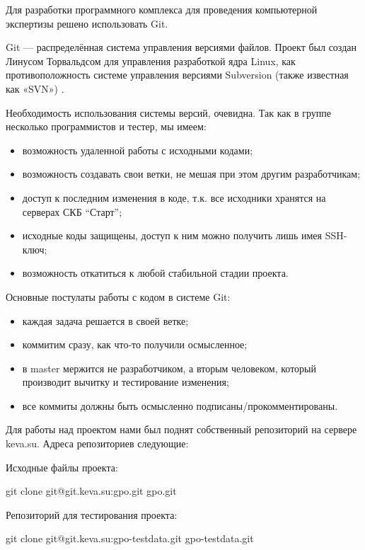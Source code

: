 Для разработки программного комплекса для проведения компьютерной экспертизы решено использовать Git.

Git  — распределённая система управления версиями файлов. Проект был создан Линусом Торвальдсом для управления разработкой ядра Linux,  как противоположность  системе управления версиями Subversion (также известная как «SVN») \cite{progit}.

Необходимость использования системы версий, очевидна. Так как в группе несколько программистов и тестер, мы имеем:
\begin{itemize}
\item возможность удаленной работы с исходными кодами;
\item возможность создавать свои ветки, не мешая при этом другим разработчикам;
\item доступ к последним изменения в коде, т.к. все исходники хранятся на серверах СКБ “Старт”;
\item исходные коды защищены, доступ к ним можно получить лишь имея SSH-ключ;
\item возможность откатиться к любой стабильной стадии проекта.
\end{itemize}

Основные постулаты работы с кодом в системе Git:

\begin{itemize}
\item каждая задача решается в своей ветке;
\item коммитим сразу, как что-то получили осмысленное;
\item в master мержится не разработчиком, а вторым человеком, который производит вычитку и тестирование изменения;
\item все коммиты должны быть осмысленно подписаны/прокомментированы.
\end{itemize}

Для работы над проектом нами был поднят собственный репозиторий на сервере keva.su.
Адреса репозиториев следующие:

Исходные файлы проекта:

git clone git@git.keva.su:gpo.git gpo.git

Репозиторий для тестирования проекта:

git clone git@git.keva.su:gpo-testdata.git gpo-testdata.git
